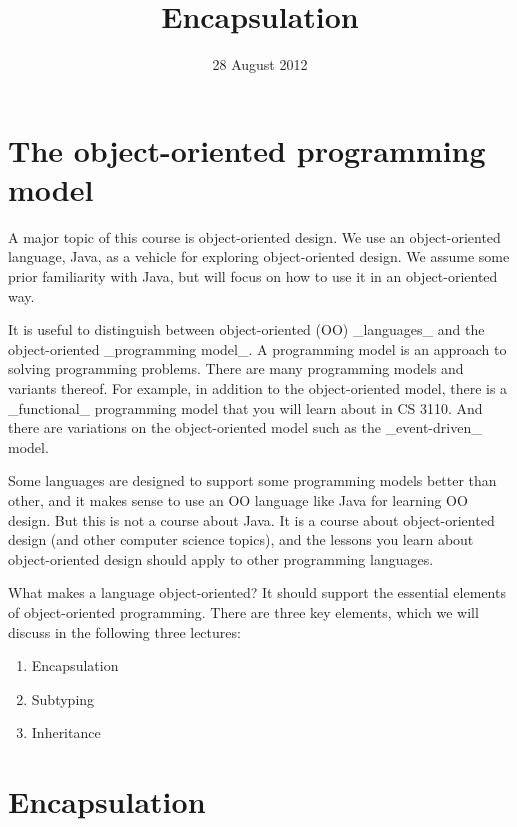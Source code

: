 \documentclass{article}
\title{Encapsulation}
\date{28 August 2012}      %
\begin{document}
\maketitle

\section{The object-oriented programming model}

A major topic of this course is object-oriented design. We use an
object-oriented language, Java, as a vehicle for exploring
object-oriented design. We assume some prior familiarity with Java,
but will focus on how to use it in an object-oriented way.

It is useful to distinguish between object-oriented (OO) _languages_ and
the object-oriented _programming model_. A programming model is an
approach to solving programming problems. There are many programming
models and variants thereof. For example, in addition to the
object-oriented model, there is a _functional_ programming model that
you will learn about in CS 3110. And there are variations on the
object-oriented model such as the _event-driven_ model.

Some languages are designed to support some programming models better
than other, and it makes sense to use an OO language like Java for
learning OO design. But this is not a course about Java. It is a
course about object-oriented design (and other computer science
topics), and the lessons you learn about object-oriented design should
apply to other programming languages.

What makes a language object-oriented? It should support the essential
elements of object-oriented programming. There are three key elements,
which we will discuss in the following three lectures:

\begin{enumerate}
\item Encapsulation
\item Subtyping
\item Inheritance
\end{enumerate}

\section{Encapsulation}
\end{document}
